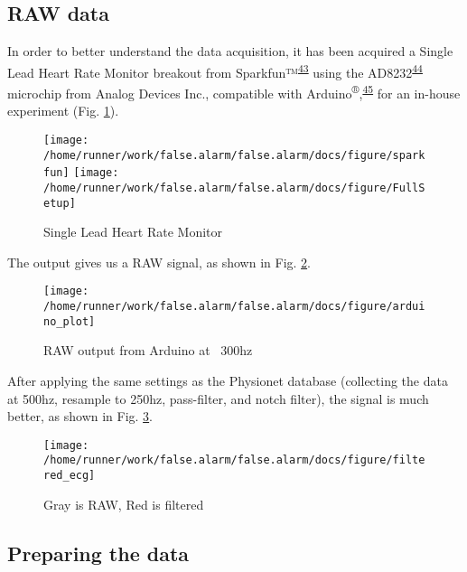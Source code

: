 \documentclass[12pt,twoside]{fmupthesis}
\begin{document}
\hypertarget{raw-data}{%
\subsection{RAW data}\label{raw-data}}

In order to better understand the data acquisition, it has been acquired a Single Lead Heart Rate
Monitor breakout from Sparkfun™\textsuperscript{\protect\hyperlink{ref-sparkfun2021}{43}} using the AD8232\textsuperscript{\protect\hyperlink{ref-AnalogDevices2020}{44}} microchip
from Analog Devices Inc., compatible with Arduino\textsuperscript{®},\textsuperscript{\protect\hyperlink{ref-arduino2021}{45}} for an in-house experiment
(Fig. \ref{fig:ad8232}).
\begin{figure}

{\centering \texttt{[image: /home/runner/work/false.alarm/false.alarm/docs/figure/sparkfun]} \texttt{[image: /home/runner/work/false.alarm/false.alarm/docs/figure/FullSetup]} 

}

\caption{Single Lead Heart Rate Monitor}\label{fig:ad8232}
\end{figure}
The output gives us a RAW signal, as shown in Fig. \ref{fig:rawsignal}.
\begin{figure}

{\centering \texttt{[image: /home/runner/work/false.alarm/false.alarm/docs/figure/arduino\_plot]} 

}

\caption{RAW output from Arduino at ~300hz}\label{fig:rawsignal}
\end{figure}
After applying the same settings as the Physionet database (collecting the data at 500hz, resample
to 250hz, pass-filter, and notch filter), the signal is much better, as shown in Fig.
\ref{fig:filtersignal}.
\begin{figure}

{\centering \texttt{[image: /home/runner/work/false.alarm/false.alarm/docs/figure/filtered\_ecg]} 

}

\caption{Gray is RAW, Red is filtered}\label{fig:filtersignal}
\end{figure}
\hypertarget{preparing-the-data}{%
\subsection{Preparing the data}\label{preparing-the-data}}
\end{document}
